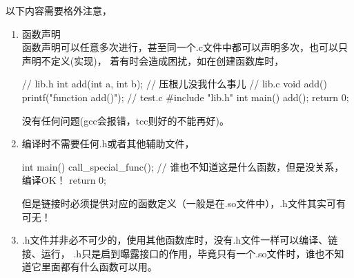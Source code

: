 以下内容需要格外注意，
\begin{enumerate}
  \item 函数声明\\
  函数声明可以任意多次进行，甚至同一个.c文件中都可以声明多次，也可以只声明不定义(实现)，
  着有时会造成困扰，如在创建函数库时，\\
  \begin{cppcode}
  // lib.h
  int add(int a, int b); // 压根儿没我什么事儿
  // lib.c
  void add() {
    printf("function add()\n");
  }
  // test.c
  #include "lib.h"
  int main() {
    add();
    return 0;
  }
  \end{cppcode}
  
  没有任何问题(gcc会报错，tcc则好的不能再好)。
  \item 编译时不需要任何.h或者其他辅助文件，\\
  \begin{cppcode}
  int main() {
    call_special_func(); // 谁也不知道这是什么函数，但是没关系，编译OK！
    return 0;
  }
  \end{cppcode}

  但是链接时必须提供对应的函数定义（一般是在.so文件中），.h文件其实可有可无！
  \item .h文件并非必不可少的，使用其他函数库时，没有.h文件一样可以编译、链接、运行，
  .h只是启到曝露接口的作用，毕竟只有一个.so文件时，谁也不知道它里面都有什么函数可以用。
\end{enumerate}
